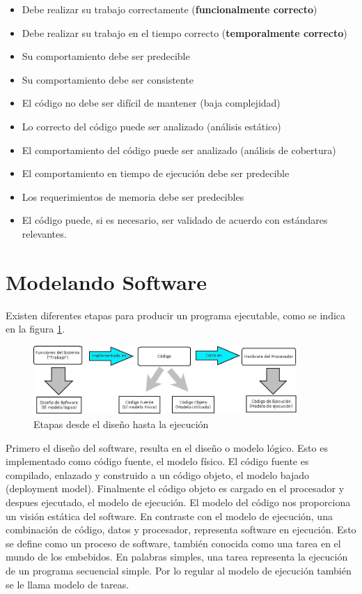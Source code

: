 \documentclass[12pt, twoside]{report}
\begin{document}
\begin{itemize}
	\item Debe realizar su trabajo correctamente (\textbf{funcionalmente correcto})
	\item Debe realizar su trabajo en el tiempo correcto (\textbf{temporalmente correcto})
	\item Su comportamiento debe ser predecible
	\item Su comportamiento debe ser consistente
	\item El código no debe ser difícil de mantener (baja complejidad)
	\item Lo correcto del código puede ser analizado (análisis estático)
	\item El comportamiento del código puede ser analizado (análisis de cobertura) 
	\item El comportamiento en tiempo de ejecución debe ser predecible
	\item Los requerimientos de memoria debe ser predecibles
	\item El código puede, si es necesario, ser validado de acuerdo con estándares relevantes. 
	
\end{itemize} 

\section{Modelando Software}
Existen diferentes etapas para producir un programa ejecutable, como se indica en la figura \ref{cap1:001}.

\begin{figure}
\centering
\includegraphics[width=100mm]{runtime}
\caption{Etapas desde el diseño hasta la ejecución}
\label{cap1:001}
\end{figure}

Primero el diseño del software, resulta en el diseño o modelo lógico. Esto es implementado como código fuente, el modelo físico. El código fuente es compilado, enlazado y construido a un código objeto, el modelo bajado (deployment model). Finalmente el código objeto es cargado en el procesador y despues ejecutado, el modelo de ejecución. 
El modelo del código nos proporciona un visión estática del software. En contraste con el modelo de ejecución, una combinación de código, datos y procesador, representa software en ejecución. Esto se define como un proceso de software, también conocida como una tarea en el mundo de los embebidos. En palabras simples, una tarea representa la ejecución de un programa secuencial simple. Por lo regular al modelo de ejecución también se le llama modelo de tareas.
\end{document}
